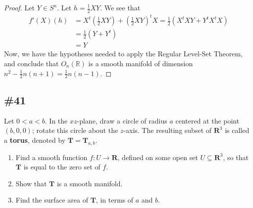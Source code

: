 \documentclass{article}
\newcommand{\R}{\mathbf{R}}
\theoremstyle{plain} %
\numberwithin{thm}{section} %
\theoremstyle{definition}
\begin{document}
\begin{proof}
            Let \(Y \in S^n\). Let \(h = \frac{1}{2}XY\). We see that
            \begin{align*}
                f'(X)(h) &= X^t \left( \frac{1}{2}XY \right) + \left( \frac{1}{2}XY \right)^t X = \frac{1}{2}\left( X^t XY + Y^t X^t X \right) \\
                &= \frac{1}{2}(Y + Y^t) \tag{\(X\) is orthogonal} \\
                &= Y \tag{\(Y\) is symmetric}
            \end{align*}
            Now, we have the hypotheses needed to apply the Regular Level-Set Theorem, and conclude that \(O_n(\mathbb{R})\) is a smooth manifold of dimension \(n^2 - \frac{1}{2}n(n+1) = \frac{1}{2}n(n-1)\).    
        \end{proof}
        \newpage
        \subsection{\#41}
        Let $0<a<b$. In the $xz$-plane, draw a circle of radius $a$ centered at the point $(b,0,0)$; rotate this circle about the $z$-axis. The resulting subset of $\R^3$ is called a \textbf{torus}, denoted by $\mathbf{T}=\mathbf{T}_{a,b}$.
        \begin{enumerate}[label=(\alph*)]
            \item Find a smooth function $f:U\rightarrow \R$, defined on some open set $U\subseteq \R^3$, so that $\mathbf{T}$ is equal to the zero set of $f$.
            
            \item Show that $\mathbf{T}$ is a smooth manifold.
            
            \item Find the surface area of $\mathbf{T}$, in terms of $a$ and $b$.
        \end{enumerate}
\end{document}
